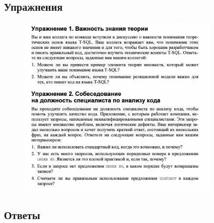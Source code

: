 \newpage
\subsection*{Упражнения}

\begin{figure}[h!]
	\begin{center}
		\includegraphics[width=0.9\textwidth]{img/ex1.png}
	\end{center}
	\captionsetup{justification=centering}
\end{figure}

\subsection*{Ответы}

